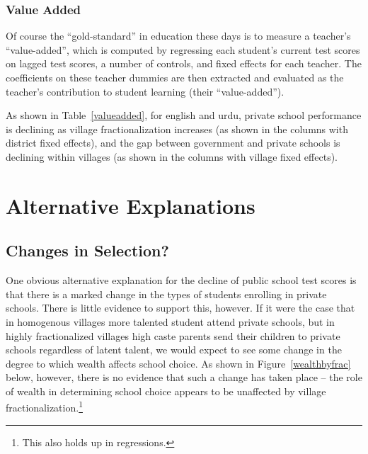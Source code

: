 \documentclass[12pt]{article}
\begin{document}


\subsubsection{Value Added}\label{} 
Of course the ``gold-standard'' in education these days is to measure a teacher's ``value-added'', which is computed by regressing each student's current test scores on lagged test scores, a number of controls, and fixed effects for each teacher. The coefficients on these teacher dummies are then extracted and evaluated as the teacher's contribution to student learning (their ``value-added''). 

As shown in Table~\ref{valueadded}, for english and urdu, private school performance is declining as village fractionalization increases (as shown in the columns with district fixed effects), and the gap between government and private schools is declining within villages (as shown in the columns with village fixed effects). 




\section{Alternative Explanations}\label{alts}

\subsection{Changes in Selection?}\label{}
One obvious alternative explanation for the decline of public school test scores is that there is a marked change in the types of students enrolling in private schools. There is little evidence to support this, however. If it were the case that in homogenous villages more talented student attend private schools, but in highly fractionalized villages high caste parents send their children to private schools regardless of latent talent, we would expect to see some change in the degree to which wealth affects school choice. As shown in Figure~\ref{wealthbyfrac} below, however, there is no evidence that such a change has taken place -- the role of wealth in determining school choice appears to be unaffected by village fractionalization.\footnote{This also holds up in regressions.} 
\end{document}
